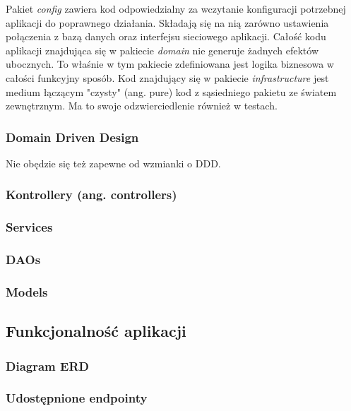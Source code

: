 \documentclass[../main.tex]{subfiles}
\begin{document}
Pakiet \textit{config} zawiera kod odpowiedzialny za wczytanie konfiguracji potrzebnej aplikacji do poprawnego działania. Składają się na nią zarówno ustawienia połączenia z bazą danych oraz interfejsu sieciowego aplikacji.\newline\newline
Całość kodu aplikacji znajdująca się w pakiecie \textit{domain} nie generuje żadnych efektów ubocznych. To właśnie w tym pakiecie zdefiniowana jest logika biznesowa w całości funkcyjny sposób.\newline\newline
Kod znajdujący się w pakiecie \textit{infrastructure} jest medium łączącym "czysty" (ang. pure) kod z sąsiedniego pakietu ze światem zewnętrznym. Ma to swoje odzwierciedlenie również w testach.\newline\newline


\subsubsection{Domain Driven Design}
Nie obędzie się też zapewne od wzmianki o DDD.

\subsubsection{Kontrollery (ang. controllers)}

\subsubsection{Services}
\subsubsection{DAOs}
\subsubsection{Models}

\vspace{15ex}






\subsection{Funkcjonalność aplikacji}

\subsubsection{Diagram ERD}

\subsubsection{Udostępnione endpointy}
\end{document}
